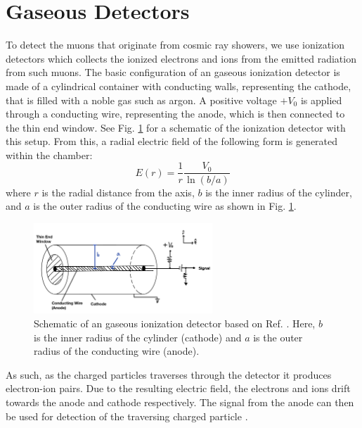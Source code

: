 \documentclass[a4paper]{report}
\numberwithin{equation}{section}
\begin{document}
\section{Gaseous Detectors}

To detect the muons that originate from cosmic ray showers, we use ionization detectors which collects the ionized electrons and ions 
from the emitted radiation from such muons. The basic configuration of an gaseous ionization detector is 
made of a cylindrical container with conducting walls, representing the cathode, that is filled with a noble gas such as argon. A positive voltage 
$+V_0$ is applied through a conducting wire, representing the anode, which is then connected to the thin end window.
See Fig. \ref{fig:ionization_chamber_schematic} 
for a schematic of the ionization detector with this setup. From this, a radial electric field of the following form is generated within the chamber:
\begin{equation}
	E(r) = \frac{1}{r}\frac{V_0}{\ln (b / a)}
\end{equation}
where $r$ is the radial distance from the axis, $b$ is the inner radius of the cylinder, and $a$ is the outer radius of the conducting 
wire as shown in Fig. \ref{fig:ionization_chamber_schematic}. \par 

\begin{figure}[!h]
	\centering
	\includegraphics[width=0.6\textwidth]{ionization_chamber_schematic.png}
	\caption{Schematic of an gaseous ionization detector based on Ref. \cite{Leo1994}. Here, $b$ is the inner radius of the cylinder (cathode) and $a$ is the outer radius 
	of the conducting wire (anode).}
	\label{fig:ionization_chamber_schematic}	
\end{figure}

As such, as the charged particles traverses through the detector it produces electron-ion pairs. Due to the resulting electric field, 
the electrons and ions drift towards the anode and cathode respectively. The signal from the anode can then be used for detection of the 
traversing charged particle \cite{Leo1994}. \par 
\end{document}

